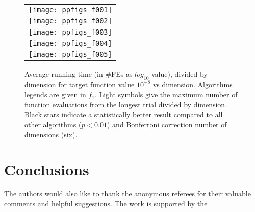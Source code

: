     \begin{figure}[h!tb]
        \begin{tabular}
            {c@{\hspace*{-0.00001\textwidth}}
            }
           
        \texttt{[image: ppfigs\_f001]}\\
        \texttt{[image: ppfigs\_f002]}\\

        \texttt{[image: ppfigs\_f003]}\\
        \texttt{[image: ppfigs\_f004]}\\
        
        \texttt{[image: ppfigs\_f005]}\\
        \end{tabular}
        \vspace{-3ex}
         \caption{Average running time (in \#FEs as $log_{10}$ value),
          divided by dimension for target function value $10^{-8}$ vs dimension. 
          Algorithms legends are given in $f_1$. Light symbols give the maximum number of 
          function evaluations from the longest trial divided by dimension. 
          Black stars indicate a statistically better result compared to 
          all other algorithms ($p < 0.01$) and Bonferroni 
          correction number of dimensions (six).}
    \end{figure}  

\section{Conclusions}
\label{conclusions}

\begin{acks}

  The authors would also like to thank the anonymous referees for
  their valuable comments and helpful suggestions. The work is
  supported by the 
\end{acks}
